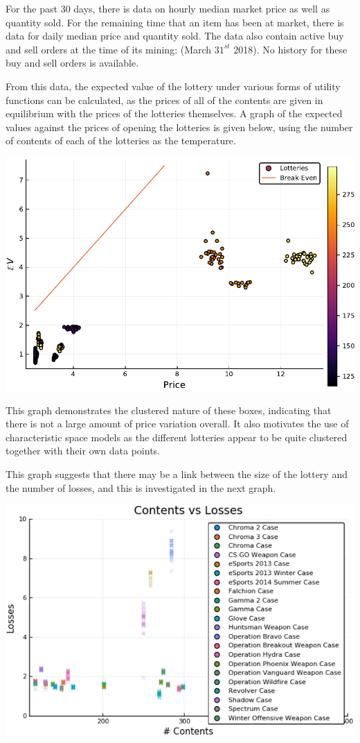 \documentclass[12pt]{paper}
\begin{document}
For the past 30 days, there is data on hourly median market price as
well as quantity sold. For the remaining time that an item has been at
market, there is data for daily median price and quantity sold. The
data also contain active buy and sell orders at the time of its
mining: (March $31^{st}$ 2018). No history for these buy and sell orders
is available.

From this data, the expected value of the lottery under various forms
of utility functions can be calculated, as the prices of all of the
contents are given in equilibrium with the prices of the lotteries
themselves. A graph of the expected values against the prices of
opening the lotteries is given below, using the number of contents of
each of the lotteries as the temperature.

\begin{center}
\includegraphics[width=.9\linewidth]{../Plots/BreakEvenScatter.pdf}
\end{center}

This graph demonstrates the clustered nature of these boxes, indicating
that there is not a large amount of price variation overall. It also
motivates the use of characteristic space models as the different
lotteries appear to be quite clustered together with their own data
points.

This graph suggests that there may be a link between the size of the
lottery and the number of losses, and this is investigated in the next
graph.

\begin{center}
\includegraphics[width=.9\linewidth]{../Plots/LossesVSize.pdf}
\end{center}
\end{document}
